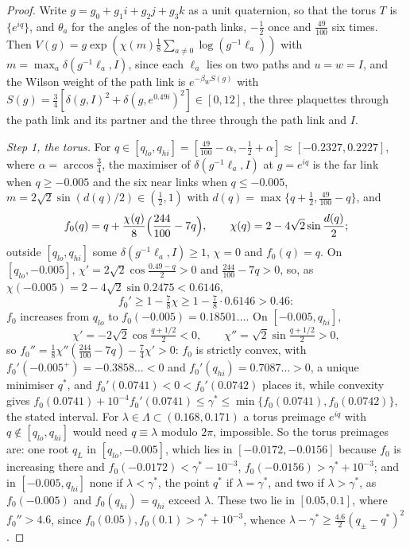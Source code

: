 \documentclass[11pt]{amsart}
\theoremstyle{definition}
\theoremstyle{remark}
\numberwithin{equation}{section}
\begin{document}
\begin{proof}
Write $g=g_0+g_1i+g_2j+g_3k$ as a unit quaternion, so that the torus $T$ is
$\{e^{iq}\}$, and $\theta_a$ for the angles of the non-path links, $-\frac12$
once and $\frac{49}{100}$ six times. Then $V(g)=g\exp(\chi(m)\frac18\sum_{a
\ne0}\log(g^{-1}\ell_a))$ with $m=\max_a\delta(g^{-1}\ell_a,I)$, since each
$\ell_a$ lies on two paths and $u=w=I$, and the Wilson weight of the path
link is $e^{-\beta_WS(g)}$ with $S(g)=\frac34[\delta(g,I)^2+\delta(g,e^{0.49i})^2]
\in[0,12]$, the three plaquettes through the path link and its partner and
the three through the path link and $I$.

\emph{Step 1, the torus.} For $q\in[q_{lo},q_{hi}]=[\frac{49}{100}-\alpha,
-\frac12+\alpha]\approx[-0.2327,0.2227]$, where $\alpha=\arccos\frac34$, the
maximiser of $\delta(g^{-1}\ell_a,I)$ at $g=e^{iq}$ is the far link when
$q\ge-0.005$ and the six near links when $q\le-0.005$, $m=2\sqrt2\sin(d(q)/2)
\in(\frac12,1)$ with $d(q)=\max\{q+\frac12,\frac{49}{100}-q\}$, and
\[
f_0(q)=q+\frac{\chi(q)}8\Bigl(\frac{244}{100}-7q\Bigr),\qquad\chi(q)=2-4
\sqrt2\sin\frac{d(q)}2 ;
\]
outside $[q_{lo},q_{hi}]$ some $\delta(g^{-1}\ell_a,I)\ge1$, $\chi=0$ and
$f_0(q)=q$. On $[q_{lo},-0.005]$, $\chi'=2\sqrt2\cos\frac{0.49-q}2>0$ and
$\frac{244}{100}-7q>0$, so, as $\chi(-0.005)=2-4\sqrt2\sin0.2475<0.6146$,
\[
f_0'\ge1-\tfrac78\chi\ge1-\tfrac78\cdot0.6146>0.46 :
\]
$f_0$ increases from $q_{lo}$ to $f_0(-0.005)=0.18501\ldots$. On
$[-0.005,q_{hi}]$,
\[
\chi'=-2\sqrt2\cos\tfrac{q+1/2}2<0,\qquad\chi''=\sqrt2\sin\tfrac{q+1/2}2>0,
\]
so $f_0''=\frac18\chi''(\frac{244}{100}-7q)-\frac74\chi'>0$: $f_0$ is strictly
convex, with $f_0'(-0.005^+)=-0.3858\ldots<0$ and $f_0'(q_{hi})=0.7087\ldots
>0$, a unique minimiser $q^*$, and $f_0'(0.0741)<0<f_0'(0.0742)$ places it,
while convexity gives $f_0(0.0741)+10^{-4}f_0'(0.0741)\le\gamma^*\le\min\{
f_0(0.0741),f_0(0.0742)\}$, the stated interval. For $\lambda\in\Lambda
\subset(0.168,0.171)$ a torus preimage $e^{iq}$ with $q\notin[q_{lo},q_{hi}]$
would need $q\equiv\lambda$ modulo $2\pi$, impossible. So the torus
preimages are: one root $q_L$ in $[q_{lo},-0.005]$, which lies in $[-0.0172,
-0.0156]$ because $f_0$ is increasing there and $f_0(-0.0172)<\gamma^*-10^{-3}$,
$f_0(-0.0156)>\gamma^*+10^{-3}$; and in $[-0.005,q_{hi}]$ none if $\lambda<
\gamma^*$, the point $q^*$ if $\lambda=\gamma^*$, and two if $\lambda>
\gamma^*$, as $f_0(-0.005)$ and $f_0(q_{hi})=q_{hi}$ exceed $\lambda$. These
two lie in $[0.05,0.1]$, where $f_0''>4.6$, since $f_0(0.05),f_0(0.1)>
\gamma^*+10^{-3}$, whence $\lambda-\gamma^*\ge\frac{4.6}2(q_\pm-q^*)^2$.


\end{proof}
\end{document}
